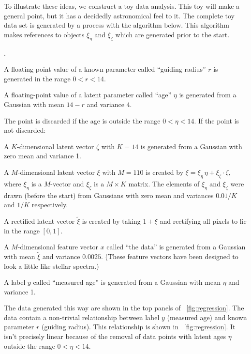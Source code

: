 \documentclass{article}
\newcommand{\figref}[1]{\figurename~\ref{#1}}
\newenvironment{hoggnumerate}
  {\begin{list}
    {\arabic{enumii}.}
    {\usecounter{enumii}
     \setlength{\itemsep}{0in}
     \setlength{\parsep}{0in}
     \setlength{\parskip}{0in}
    }
  }
{\end{list}}
\begin{document}
To illustrate these ideas, we construct a toy data analysis.
This toy will make a general point, but it has a decidedly astronomical feel to it.
The complete toy data set is generated by a process with the algorithm below.
This algorithm makes references to objects $\xi_\eta$ and $\xi_\zeta$ which are generated prior to the start.
\begin{hoggnumerate}
    \item A floating-point value of a known parameter called ``guiding radius'' $r$ is generated in the range $0<r<14$.
    \item A floating-point value of a latent parameter called ``age'' $\eta$ is generated from a Gaussian with mean $14 - r$ and variance 4.
    \item The point is discarded if the age is outside the range $0<\eta<14$. If the point is not discarded:
    \item A $K$-dimensional latent vector $\zeta$ with $K=14$ is generated from a Gaussian with zero mean and variance 1.
    \item A $M$-dimensional latent vector $\xi$ with $M=110$ is created by $\xi = \xi_\eta\,\eta + \xi_\zeta\cdot\zeta$, where $\xi_\eta$ is a $M$-vector and $\xi_\zeta$ is a $M\times K$ matrix.
    The elements of $\xi_\eta$ and $\xi_\zeta$ were drawn (before the start) from Gaussians with zero mean and variances $0.01/K$ and $1/K$ respectively.
    \item A rectified latent vector $\tilde{\xi}$ is created by taking $1 + \xi$ and rectifying all pixels to lie in the range $[0, 1]$.
    \item A $M$-dimensional feature vector $x$ called ``the data'' is generated from a Gaussian with mean $\tilde{\xi}$ and variance $0.0025$. (These feature vectors have been designed to look a little like stellar spectra.)
    \item A label $y$ called ``measured age'' is generated from a Gaussian with mean $\eta$ and variance 1.
\end{hoggnumerate}
The data generated this way are shown in the top panels of \figref{fig:regression}.
The data contain a non-trivial relationship between label $y$ (measured age) and known parameter $r$ (guiding radius).
This relationship is shown in \figref{fig:regression}.
It isn't precisely linear because of the removal of data points with latent ages $\eta$ outside the range $0<\eta<14$.
\end{document}
